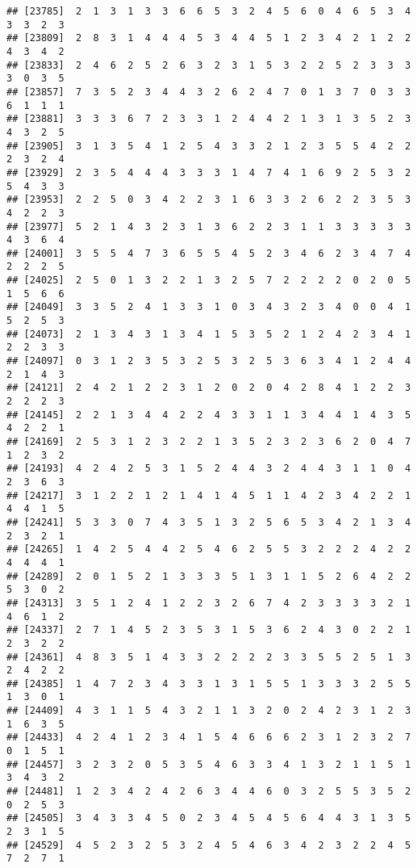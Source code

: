 \documentclass[
]{article}
\begin{document}
\begin{verbatim}
## [23785]  2  1  3  1  3  3  6  6  5  3  2  4  5  6  0  4  6  5  3  4  3  3  2  3
## [23809]  2  8  3  1  4  4  4  5  3  4  4  5  1  2  3  4  2  1  2  2  4  3  4  2
## [23833]  2  4  6  2  5  2  6  3  2  3  1  5  3  2  2  5  2  3  3  3  3  0  3  5
## [23857]  7  3  5  2  3  4  4  3  2  6  2  4  7  0  1  3  7  0  3  3  6  1  1  1
## [23881]  3  3  3  6  7  2  3  3  1  2  4  4  2  1  3  1  3  5  2  3  4  3  2  5
## [23905]  3  1  3  5  4  1  2  5  4  3  3  2  1  2  3  5  5  4  2  2  2  3  2  4
## [23929]  2  3  5  4  4  4  3  3  3  1  4  7  4  1  6  9  2  5  3  2  5  4  3  3
## [23953]  2  2  5  0  3  4  2  2  3  1  6  3  3  2  6  2  2  3  5  3  4  2  2  3
## [23977]  5  2  1  4  3  2  3  1  3  6  2  2  3  1  1  3  3  3  3  3  4  3  6  4
## [24001]  3  5  5  4  7  3  6  5  5  4  5  2  3  4  6  2  3  4  7  4  2  2  2  5
## [24025]  2  5  0  1  3  2  2  1  3  2  5  7  2  2  2  2  0  2  0  5  1  5  6  6
## [24049]  3  3  5  2  4  1  3  3  1  0  3  4  3  2  3  4  0  0  4  1  5  2  5  3
## [24073]  2  1  3  4  3  1  3  4  1  5  3  5  2  1  2  4  2  3  4  1  2  2  3  3
## [24097]  0  3  1  2  3  5  3  2  5  3  2  5  3  6  3  4  1  2  4  4  2  1  4  3
## [24121]  2  4  2  1  2  2  3  1  2  0  2  0  4  2  8  4  1  2  2  3  2  2  2  3
## [24145]  2  2  1  3  4  4  2  2  4  3  3  1  1  3  4  4  1  4  3  5  4  2  2  1
## [24169]  2  5  3  1  2  3  2  2  1  3  5  2  3  2  3  6  2  0  4  7  1  2  3  2
## [24193]  4  2  4  2  5  3  1  5  2  4  4  3  2  4  4  3  1  1  0  4  2  3  6  3
## [24217]  3  1  2  2  1  2  1  4  1  4  5  1  1  4  2  3  4  2  2  1  4  4  1  5
## [24241]  5  3  3  0  7  4  3  5  1  3  2  5  6  5  3  4  2  1  3  4  2  3  2  1
## [24265]  1  4  2  5  4  4  2  5  4  6  2  5  5  3  2  2  2  4  2  2  4  4  4  1
## [24289]  2  0  1  5  2  1  3  3  3  5  1  3  1  1  5  2  6  4  2  2  5  3  0  2
## [24313]  3  5  1  2  4  1  2  2  3  2  6  7  4  2  3  3  3  3  2  1  4  6  1  2
## [24337]  2  7  1  4  5  2  3  5  3  1  5  3  6  2  4  3  0  2  2  1  2  3  2  2
## [24361]  4  8  3  5  1  4  3  3  2  2  2  2  3  3  5  5  2  5  1  3  2  4  2  2
## [24385]  1  4  7  2  3  4  3  3  1  3  1  5  5  1  3  3  3  2  5  5  1  3  0  1
## [24409]  4  3  1  1  5  4  3  2  1  1  3  2  0  2  4  2  3  1  2  3  1  6  3  5
## [24433]  4  2  4  1  2  3  4  1  5  4  6  6  6  2  3  1  2  3  2  7  0  1  5  1
## [24457]  3  2  3  2  0  5  3  5  4  6  3  3  4  1  3  2  1  1  5  1  3  4  3  2
## [24481]  1  2  3  4  2  4  2  6  3  4  4  6  0  3  2  5  5  3  5  2  0  2  5  3
## [24505]  3  4  3  3  4  5  0  2  3  4  5  4  5  6  4  4  3  1  3  5  2  3  1  5
## [24529]  4  5  2  3  2  5  3  2  4  5  4  6  3  4  2  3  2  2  4  5  7  2  7  1

\end{verbatim}
\end{document}

